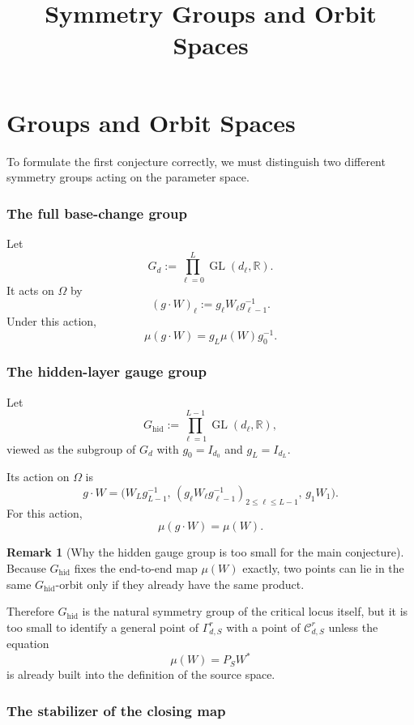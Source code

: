 \documentclass{article}
\title{Symmetry Groups and Orbit Spaces}
\date{}
\newcommand{\GL}{\operatorname{GL}}
\theoremstyle{definition}
\newtheorem{remark}[theorem]{Remark}
\begin{document}
\maketitle

\section{Groups and Orbit Spaces}

To formulate the first conjecture correctly, we must distinguish two different symmetry groups acting on the parameter space.

\subsubsection*{The full base-change group}

Let
\[
G_d:=\prod_{\ell=0}^L \GL(d_\ell,\mathbb R).
\]
It acts on $\Omega$ by
\[
(g\cdot W)_\ell := g_\ell W_\ell g_{\ell-1}^{-1}.
\]
Under this action,
\[
\mu(g\cdot W)=g_L\mu(W)g_0^{-1}.
\]

\subsubsection*{The hidden-layer gauge group}

Let
\[
G_{\mathrm{hid}}:=\prod_{\ell=1}^{L-1}\GL(d_\ell,\mathbb R),
\]
viewed as the subgroup of $G_d$ with $g_0=I_{d_0}$ and $g_L=I_{d_L}$.

Its action on $\Omega$ is
\[
g\cdot W
=
\bigl(
W_Lg_{L-1}^{-1},
\,
(g_\ell W_\ell g_{\ell-1}^{-1})_{2\le \ell\le L-1},
\,
g_1W_1
\bigr).
\]
For this action,
\[
\mu(g\cdot W)=\mu(W).
\]

\begin{remark}[Why the hidden gauge group is too small for the main conjecture]
Because $G_{\mathrm{hid}}$ fixes the end-to-end map $\mu(W)$ exactly, two points can lie in the same $G_{\mathrm{hid}}$-orbit only if they already have the same product.

Therefore $G_{\mathrm{hid}}$ is the natural symmetry group of the critical locus itself, but it is too small to identify a general point of $\Gamma_{d,S}^r$ with a point of $\mathcal C_{d,S}^r$ unless the equation
\[
\mu(W)=P_SW^\ast
\]
is already built into the definition of the source space.
\end{remark}

\subsubsection*{The stabilizer of the closing map}
\end{document}
